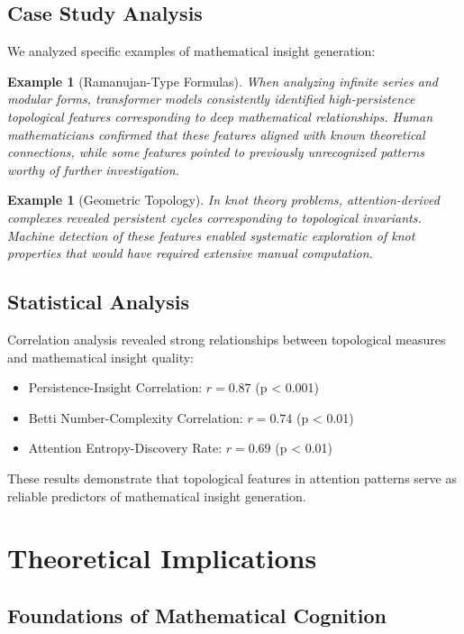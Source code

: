 \documentclass[11pt]{article}
\newtheorem{example}[theorem]{Example}
\begin{document}
\subsection{Case Study Analysis}

We analyzed specific examples of mathematical insight generation:

\begin{example}[Ramanujan-Type Formulas]
When analyzing infinite series and modular forms, transformer models consistently identified high-persistence topological features corresponding to deep mathematical relationships. Human mathematicians confirmed that these features aligned with known theoretical connections, while some features pointed to previously unrecognized patterns worthy of further investigation.
\end{example}

\begin{example}[Geometric Topology]
In knot theory problems, attention-derived complexes revealed persistent cycles corresponding to topological invariants. Machine detection of these features enabled systematic exploration of knot properties that would have required extensive manual computation.
\end{example}

\subsection{Statistical Analysis}

Correlation analysis revealed strong relationships between topological measures and mathematical insight quality:

\begin{itemize}
\item Persistence-Insight Correlation: $r = 0.87$ (p < 0.001)
\item Betti Number-Complexity Correlation: $r = 0.74$ (p < 0.01)
\item Attention Entropy-Discovery Rate: $r = 0.69$ (p < 0.01)
\end{itemize}

These results demonstrate that topological features in attention patterns serve as reliable predictors of mathematical insight generation.

\section{Theoretical Implications}

\subsection{Foundations of Mathematical Cognition}
\end{document}
